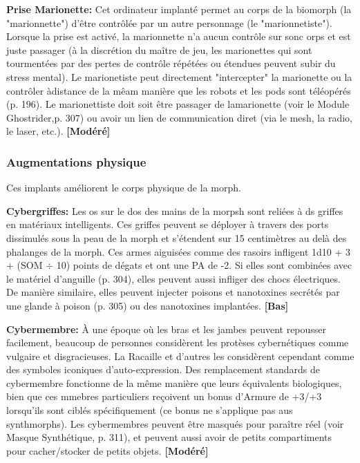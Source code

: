 {{\textbf{Prise Marionette:} Cet ordinateur implanté permet au corps de la biomorph (la "marionnette") d'être contrôlée par un autre personnage (le "marionnetiste"). Lorsque la prise est activé, la marionnette n'a aucun contrôle sur sonc orps et est juste passager (à la discrétion du maître de jeu, les marionettes qui sont tourmentées par des pertes de contrôle répétées ou étendues peuvent subir du stress mental). Le marionetiste peut directement "intercepter" la marionette ou la contrôler àdistance de la mêam manière que les robots et les pods sont téléopérés (p. 196). Le marionettiste doit soit être passager de lamarionette (voir le Module Ghostrider,p. 307) ou avoir un lien de communication diret (via le mesh, la radio, le laser, etc.). \textbf{[Modéré]} 

\subsubsection{Augmentations physique} 

Ces implants améliorent le corps physique de la morph. 

\textbf{Cybergriffes:} Les os sur le dos des mains de la morpsh sont reliées à ds griffes en matériaux intelligents. Ces griffes peuvent se déployer à travers des ports dissimulés sous la peau de la morph et s'étendent sur 15 centimètres au delà des phalanges de la morph. Ces armes aiguisées comme des rasoirs infligent 1d10 + 3 + (SOM $\div$ 10) points de dégats et ont une PA de -2. Si elles sont combinées avec le matériel d'anguille (p. 304), elles peuvent aussi infliger des chocs électriques. De manière similaire, elles peuvent injecter poisons et nanotoxines secrétés par une glande à poison (p. 305) ou des nanotoxines implantées. \textbf{[Bas]} 

\textbf{Cybermembre:} À une époque où les bras et les jambes peuvent repousser facilement, beaucoup de personnes considèrent les protèses cybernétiques comme vulgaire et disgracieuses. La Racaille et d'autres les considèrent cependant comme des symboles iconiques d'auto-expression. Des remplacement standards de cybermembre fonctionne de la même manière que leurs équivalents biologiques, bien que ces mmebres particuliers reçoivent un bonus d'Armure de +3/+3 lorsqu'ils sont ciblés spécifiquement (ce bonus ne s'applique pas aus synthmorphs). Les cybermembres peuvent être masqués pour paraître réel (voir Masque Synthétique, p. 311), et peuvent aussi avoir de petits compartiments pour cacher/stocker de petits objets. \textbf{[Modéré]} 

}}
